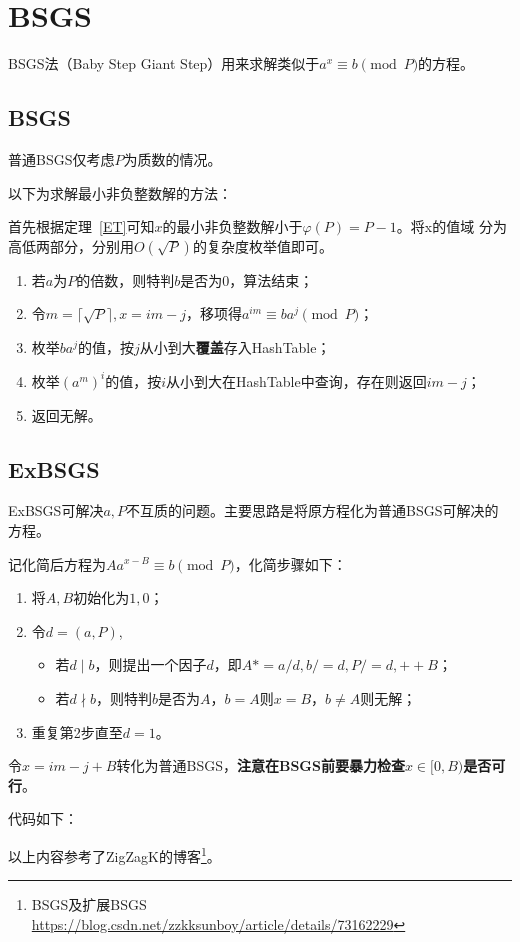 \section{BSGS}
BSGS法（Baby Step Giant Step）用来求解类似于$a^x\equiv b\pmod{P}$的方程。
\subsection{BSGS}
普通BSGS仅考虑$P$为质数的情况。

以下为求解最小非负整数解的方法：

首先根据定理~\ref{ET}可知$x$的最小非负整数解小于$\varphi(P)=P-1$。将x的值域
分为高低两部分，分别用$O(\sqrt{P})$的复杂度枚举值即可。

\begin{enumerate}
    \item 若$a$为$P$的倍数，则特判$b$是否为$0$，算法结束；
    \item 令$m=\lceil\sqrt{P}\rceil,x=im-j$，移项得$a^{im}\equiv ba^j\pmod{P}$；
    \item 枚举$ba^j$的值，按$j$从小到大{\bfseries 覆盖}存入HashTable；
    \item 枚举$(a^m)^i$的值，按$i$从小到大在HashTable中查询，存在则返回$im-j$；
    \item 返回无解。
\end{enumerate}

\subsection{ExBSGS}
ExBSGS可解决$a,P$不互质的问题。主要思路是将原方程化为普通BSGS可解决的方程。

记化简后方程为$Aa^{x-B}\equiv b\pmod{P}$，化简步骤如下：
\begin{enumerate}
    \item 将$A,B$初始化为$1,0$；
    \item 令$d=(a,P)$,
    \begin{itemize}
        \item 若$d\mid b$，则提出一个因子$d$，即$A*=a/d,b/=d,P/=d,++B$；
        \item 若$d\nmid b$，则特判$b$是否为$A$，$b=A$则$x=B$，$b\neq A$则无解；
    \end{itemize}
    \item 重复第2步直至$d=1$。
\end{enumerate}
令$x=im-j+B$转化为普通BSGS，{\bfseries 注意在BSGS前要暴力检查$x\in[0,B)$是否可行}。

代码如下：


以上内容参考了ZigZagK的博客\footnote{BSGS及扩展BSGS
\url{https://blog.csdn.net/zzkksunboy/article/details/73162229}}。
